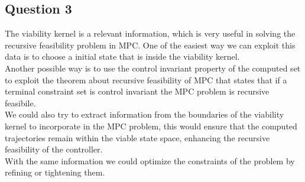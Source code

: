 \documentclass[12pt]{article}
\begin{document}
\subsection*{Question 3}
The viability kernel is a relevant information, which is very useful in solving the recursive feasibility problem in MPC. One of the easiest way we can exploit this data is to choose a initial state that is inside the viability kernel.\\
Another possible way is to use the control invariant property of the computed set to exploit the theorem about recursive feasibility of MPC that states that if a terminal constraint set is control invariant the MPC problem is recursive feasibile.\\
We could also try to extract information from the boundaries of the viability kernel to incorporate in the MPC problem, this would ensure that the computed trajectories remain within the viable state space, enhancing the recursive feasibility of the controller.\\
With the same information we could optimize the constraints of the problem by refining or tightening them.
\end{document}
